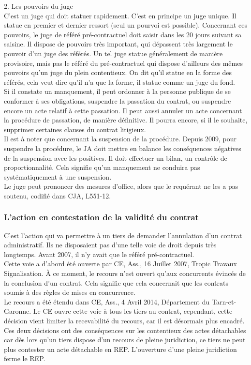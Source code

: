 \documentclass[10pt, a4paper, openany]{book}
\begin{document}
2. Les pouvoirs du juge \\
C'est un juge qui doit statuer rapidement. C'est en principe un juge unique. Il statue en premier et dernier ressort (seul un pourvoi est possible). Concernant ces pouvoirs, le juge de référé pré-contractuel doit saisir dans les 20 jours suivant sa saisine. Il dispose de pouvoirs très important, qui dépassent très largement le pouvoir d'un juge des référés. Un tel juge statue généralement de manière provisoire, mais pas le référé du pré-contractuel qui dispose d'ailleurs des mêmes pouvoirs qu'un juge du plein contentieux. On dit qu'il statue en la forme des référés, cela veut dire qu'il n'a que la forme, il statue comme un juge du fond. \\
Si il constate un manquement, il peut ordonner à la personne publique de se conformer à ses obligations, suspendre la passation du contrat, ou suspendre encore un acte relatif à cette passation. Il peut aussi annuler un acte concernant la procédure de passation, de manière définitive. Il pourra encore, si il le souhaite, supprimer certaines clauses du contrat litigieux. \\
Il est à noter que concernant la suspension de la procédure. Depuis 2009, pour suspendre la procédure, le JA doit mettre en balance les conséquences négatives de la suspension avec les positives. Il doit effectuer un bilan, un contrôle de proportionnalité. Cela signifie qu'un manquement ne conduira pas systématiquement à une suspension. \\
Le juge peut prononcer des mesures d'office, alors que le requérant ne les a pas soutenu, codifié dans CJA, L551-12. 


\subsubsection{L'action en contestation de la validité du contrat}

C'est l'action qui va permettre à un tiers de demander l'annulation d'un contrat administratif. Ils ne disposaient pas d'une telle voie de droit depuis très longtemps. Avant 2007, il n'y avait que le référé pré-contractuel. \\
Cette voie a d'abord été ouverte par CE, Ass., 16 Juillet 2007, Tropic Travaux Signalisation. À ce moment, le recours n'est ouvert qu'aux concurrents évincés de la conclusion d'un contrat. Cela signifie que cela concernait que les contrats soumis à des règles de mises en concurrence. \\
Le recours a été étendu dans CE, Ass., 4 Avril 2014, Département du Tarn-et-Garonne. Le CE ouvre cette voie à tous les tiers au contrat, cependant, cette décision vient limiter la recevabilité du recours, car il est désormais plus encadré. \\
Ces deux décisions ont des conséquences sur les contentieux des actes détachables car dès lors qu'un tiers dispose d'un recours de pleine juridiction, ce tiers ne peut plus contester un acte détachable en REP. L'ouverture d'une pleine juridiction ferme le REP. 
\end{document}
